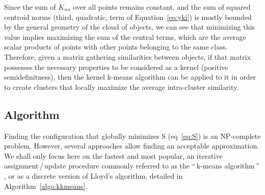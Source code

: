 \documentclass[natbib,smallextended]{svjour3}
\newcommand{\gl}[1]{``\,#1\,''} %
\begin{document}


Since the sum of $K_{nn}$ over all points remains constant, and the sum of squared centroid norms (third, quadratic, term of Equation~\ref{eq:yki}) is mostly bounded by the general geometry of the cloud of objects, we can see that minimizing this value implies maximizing the sum of the central terms, which are the average scalar products of points with other points belonging to the same class. Therefore, given a matrix gathering similarities between objects, if that matrix possesses the necessary properties to be considered as a kernel (positive semidefinitness), then the kernel k-means algorithm can be applied to it in order to create clusters that locally maximize the average intra-cluster similarity.

\subsection{Algorithm}

Finding the configuration that globally minimizes S (eq~\ref{eq:S}) is an NP-complete problem. However, several approaches allow finding an acceptable approximation. We shall only focus here on the fastest and most popular, an iterative assignment\,/\,update procedure commonly referred to as the \gl{k-means algorithm} \citep{macQueenBsmsp67}, or as a discrete version of Lloyd's algorithm, detailed in Algorithm~\ref{algo:kkmeans}.
\end{document}
